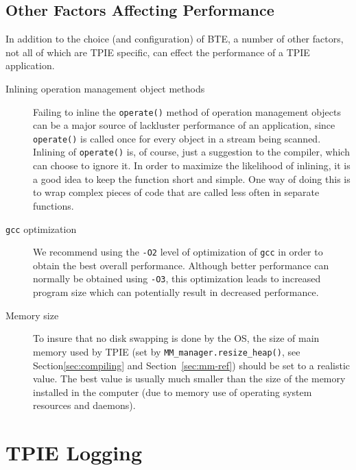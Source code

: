 \subsection{Other Factors Affecting Performance}

In addition to the choice (and configuration) of BTE, a number of other
factors, not all of which are TPIE specific, can effect the performance of
a TPIE application.

\begin{description}
\item[Inlining operation management object methods] Failing to inline the
\verb|operate()| method of operation management objects can be a major
source of lackluster performance of an application, since \verb|operate()|
is called once for every object in a stream being scanned. Inlining of
\verb|operate()| is, of course, just a suggestion to the compiler, which
can choose to ignore it. In order to maximize the likelihood of inlining,
it is a good idea to keep the function  short and simple. One way of
doing this is to wrap complex pieces of code that are called less often in
separate functions.
\item[\verb|gcc| optimization] We recommend using the \verb|-O2| level of
optimization of \verb|gcc| in order to obtain the best overall
performance. Although better performance can normally be obtained using
\verb|-O3|, this optimization leads to increased program size which can
potentially result in decreased performance.
\item[Memory size] To insure that no disk swapping is done by the OS, the
size of main memory used by TPIE (set by \verb|MM_manager.resize_heap()|,
see Section\ref{sec:compiling} and Section~\ref{sec:mm-ref}) should be set
to a realistic value. The best value is usually much smaller than the size
of the memory installed in the computer (due to memory use of operating
system resources and daemons).
\end{description}



\section{TPIE Logging}
\label{sec:logging}

